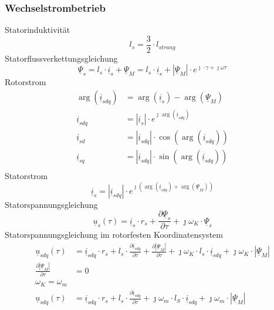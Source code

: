 \subsubsection{Wechselstrombetrieb}
Statorinduktivität
\begin{equation}
	l_s = \frac{3}{2} \cdot l_{strang}
\end{equation}
Statorflussverkettungsgleichung
\begin{equation}
	\underline{\Psi}_s = l_s \cdot \underline{i}_s + \underline{\Psi}_M = l_s \cdot \underline{i}_s + |\underline{\Psi}_M | \cdot e^{\jmath \cdot \gamma + \jmath \omega \tau}
\end{equation}
Rotorstrom
\begin{align}
	\arg(\underline{i}_{sdq}) &= \arg(\underline{i}_s) -\arg(\underline{\Psi}_M)\\
	\underline{i}_{sdq} &= |\underline{i}_s| \cdot e^{\jmath \arg(\underline{i}_{sdq})}\\
	\underline{i}_{sd} & = |\underline{i}_{sdq}| \cdot \cos(\arg(\underline{i}_{sdq}))\\
	\underline{i}_{sq} & = |\underline{i}_{sdq}| \cdot \sin(\arg(\underline{i}_{sdq}))\\
\end{align}
Statorstrom
\begin{equation}
	\underline{i}_{s} = |\underline{i}_{sdq}| \cdot e^{\jmath (\arg(\underline{i}_{sdq}) + \arg(\underline{\Psi}_{M}))}
\end{equation}
Statorspannungsgleichung
\begin{equation}
	\underline{u}_s(\tau) = \underline{i}_s \cdot r_s + \frac{\partial \underline{\Psi}_s}{\partial \tau} + \jmath \omega_K \cdot \underline{\Psi}_s
\end{equation}
Statorspannungsgleichung im rotorfesten Koordinatensystem
\begin{align}
	\underline{u}_{sdq}(\tau) &= \underline{i}_{sdq} \cdot r_s + l_s \cdot \frac{\partial \underline{i}_{sdq}}{\partial \tau} + \frac{\partial |\underline{\Psi}_M|}{\partial \tau} + \jmath \omega_K \cdot l_s \cdot \underline{i}_{sdq} + \jmath \omega_K \cdot |\underline{\Psi}_M|\label{glg:Statorspannungraumzeiger rotor} \\
	\frac{\partial |\underline{\Psi}_M|}{\partial \tau} & = 0 \label{glg:rotorfestmagnetisch} \\
	\omega_K=\omega_m \label{glg:rotorfestgeschwindigkeit} \\
	\underline{u}_{sdq}(\tau) &= \underline{i}_{sdq} \cdot r_s + l_s \cdot \frac{\partial \underline{i}_{sdq}}{\partial \tau} + \jmath \omega_m \cdot l_S \cdot \underline{i}_{sdq} + \jmath \omega_m \cdot |\underline{\Psi}_M|
\end{align}
